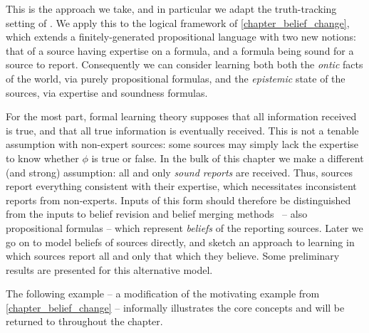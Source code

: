 This is the approach we take, and in particular we adapt the truth-tracking
setting of \textcite{baltag_tt_2019}. We apply this to the logical framework of
\cref{chapter_belief_change}, which extends a finitely-generated propositional
language with two new notions: that of a source having expertise on a
formula, and a formula being sound for a source to report. Consequently
we can consider learning both both the \emph{ontic} facts of the world, via
purely propositional formulas, and the \emph{epistemic} state of the
sources, via expertise and soundness formulas.

For the most part, formal learning theory supposes that all information
received is true, and that all true information is eventually
received.\footnotemark{} This is not a tenable assumption with non-expert
sources: some sources may simply lack the expertise to know whether $\phi$ is
true or false. In the bulk of this chapter we make a different (and strong)
assumption: all and only \emph{sound reports} are received. Thus, sources
report everything consistent with their expertise, which necessitates
inconsistent reports from non-experts. Inputs of this form should therefore be
distinguished from the inputs to belief revision and belief merging
methods~\cite{alchourron1985logic,konieczny2002merging} -- also propositional
formulas -- which represent \emph{beliefs} of the reporting sources.
%
Later we go on to model beliefs of sources directly, and sketch an approach to
learning in which sources report all and only that which they believe. Some
preliminary results are presented for this alternative model.


The following example -- a modification of the motivating example from
\cref{chapter_belief_change} -- informally illustrates the core concepts and
will be returned to throughout the chapter.

